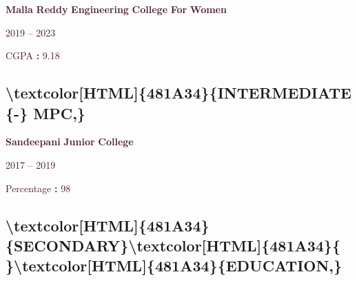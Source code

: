 \documentclass[12pt]{article}%
\begin{document}
%
\begin{justify}%
\textcolor[HTML]{481A34}{\textbf{Malla}}\textcolor[HTML]{481A34}{\textbf{ }}\textcolor[HTML]{481A34}{\textbf{Reddy}}\textcolor[HTML]{481A34}{\textbf{ }}\textcolor[HTML]{481A34}{\textbf{Engineering}}\textcolor[HTML]{481A34}{\textbf{ }}\textcolor[HTML]{481A34}{\textbf{College}}\textcolor[HTML]{481A34}{\textbf{ }}\textcolor[HTML]{481A34}{\textbf{For}}\textcolor[HTML]{481A34}{\textbf{ }}\textcolor[HTML]{481A34}{\textbf{Women}}%
\end{justify}%
\newline%
%
\begin{justify}%
\textcolor[HTML]{481A34}{2019}\textcolor[HTML]{481A34}{ }\textcolor[HTML]{481A34}{–}\textcolor[HTML]{481A34}{ }\textcolor[HTML]{481A34}{2023}%
\end{justify}%
\newline%
%
\begin{justify}%
\textcolor[HTML]{481A34}{CGPA}\textcolor[HTML]{481A34}{ }\textcolor[HTML]{481A34}{\textbf{:}}\textcolor[HTML]{481A34}{\textbf{ }}\textcolor[HTML]{481A34}{9.18}%
\end{justify}%
\newline%
%
\subsection{\textbackslash{}textcolor{[}HTML{]}\{481A34\}\{INTERMEDIATE \{{-}\} MPC,\}}%
\label{subsec:subsec24}%

%
\begin{flushleft}%
\textcolor[HTML]{481A34}{\textbf{Sandeepani}}\textcolor[HTML]{481A34}{\textbf{ }}\textcolor[HTML]{481A34}{\textbf{Junior}}\textcolor[HTML]{481A34}{\textbf{ }}\textcolor[HTML]{481A34}{\textbf{College}}%
\end{flushleft}%
\newline%
%
\begin{justify}%
\textcolor[HTML]{481A34}{2017}\textcolor[HTML]{481A34}{ }\textcolor[HTML]{481A34}{–}\textcolor[HTML]{481A34}{ }\textcolor[HTML]{481A34}{2019}%
\end{justify}%
\newline%
%
\begin{justify}%
\textcolor[HTML]{481A34}{Percentage}\textcolor[HTML]{481A34}{ }\textcolor[HTML]{481A34}{\textbf{: }}\textcolor[HTML]{481A34}{98}%
\end{justify}%
\newline%
%
\subsection{\textbackslash{}textcolor{[}HTML{]}\{481A34\}\{SECONDARY\}\textbackslash{}textcolor{[}HTML{]}\{481A34\}\{ \}\textbackslash{}textcolor{[}HTML{]}\{481A34\}\{EDUCATION,\}}%
\label{subsec:subsec29}%
\end{document}
